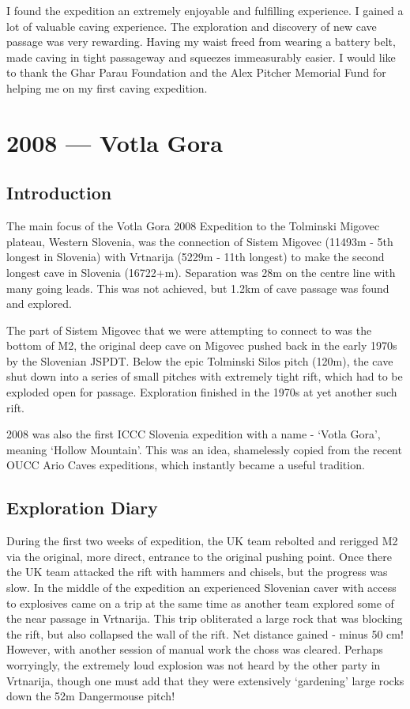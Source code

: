 I found the expedition an extremely enjoyable and fulfilling experience.
I gained a lot of valuable caving experience. The exploration and
discovery of new cave passage was very rewarding. Having my waist freed
from wearing a battery belt, made caving in tight passageway and
squeezes immeasurably easier. I would like to thank the Ghar Parau
Foundation and the Alex Pitcher Memorial Fund for helping me on my first
caving expedition.


\chapter{2008 --- Votla Gora}\label{votla-gora}

\section{Introduction}\label{introduction-1}

The main focus of the Votla Gora 2008 Expedition to the Tolminski
Migovec plateau, Western Slovenia, was the connection of Sistem Migovec
(11493m - 5th longest in Slovenia) with Vrtnarija (5229m - 11th longest)
to make the second longest cave in Slovenia (16722+m). Separation was
28m on the centre line with many going leads. This was not achieved, but
1.2km of cave passage was found and explored.

The part of Sistem Migovec that we were attempting to connect to was the
bottom of M2, the original deep cave on Migovec pushed back in the early
1970s by the Slovenian JSPDT. Below the epic Tolminski Silos pitch
(120m), the cave shut down into a series of small pitches with extremely
tight rift, which had to be exploded open for passage. Exploration
finished in the 1970s at yet another such rift.

2008 was also the first ICCC Slovenia expedition with a name - `Votla
Gora', meaning `Hollow Mountain'. This was an idea, shamelessly copied
from the recent OUCC Ario Caves expeditions, which instantly became a
useful tradition.

\section{Exploration Diary}\label{exploration-diary}

During the first two weeks of expedition, the UK team rebolted and
rerigged M2 via the original, more direct, entrance to the original
pushing point. Once there the UK team attacked the rift with hammers and
chisels, but the progress was slow. In the middle of the expedition an
experienced Slovenian caver with access to explosives came on a trip at
the same time as another team explored some of the near passage in
Vrtnarija. This trip obliterated a large rock that was blocking the
rift, but also collapsed the wall of the rift. Net distance gained -
minus 50 cm! However, with another session of manual work the choss was
cleared. Perhaps worryingly, the extremely loud explosion was not heard
by the other party in Vrtnarija, though one must add that they were
extensively `gardening' large rocks down the 52m Dangermouse pitch!

